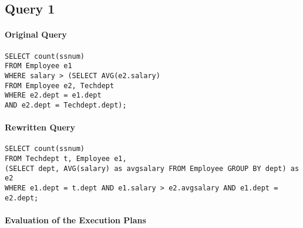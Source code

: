 \documentclass[11pt]{scrartcl}
\begin{document}
\subsection*{Query 1}

\paragraph{Original Query}

{\small
\begin{verbatim}
SELECT count(ssnum)
FROM Employee e1
WHERE salary > (SELECT AVG(e2.salary)
FROM Employee e2, Techdept
WHERE e2.dept = e1.dept
AND e2.dept = Techdept.dept);
\end{verbatim}
}

\paragraph{Rewritten Query}

{\small
\begin{verbatim}
SELECT count(ssnum)
FROM Techdept t, Employee e1,
(SELECT dept, AVG(salary) as avgsalary FROM Employee GROUP BY dept) as e2
WHERE e1.dept = t.dept AND e1.salary > e2.avgsalary AND e1.dept = e2.dept;
\end{verbatim}
}

\newpage
\paragraph{Evaluation of the Execution Plans}
\end{document}
